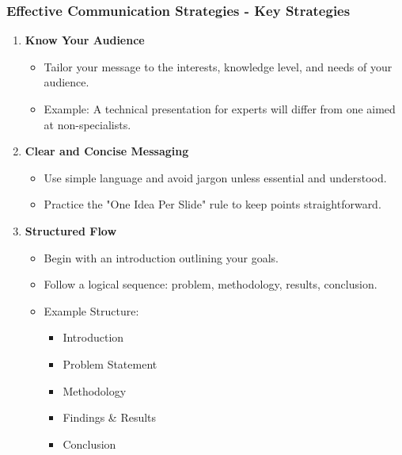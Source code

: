 \documentclass[aspectratio=169]{beamer}
\begin{document}
\begin{frame}[fragile]
    \frametitle{Effective Communication Strategies - Key Strategies}
    \begin{enumerate}
        \item \textbf{Know Your Audience}
        \begin{itemize}
            \item Tailor your message to the interests, knowledge level, and needs of your audience.
            \item Example: A technical presentation for experts will differ from one aimed at non-specialists.
        \end{itemize}

        \item \textbf{Clear and Concise Messaging}
        \begin{itemize}
            \item Use simple language and avoid jargon unless essential and understood.
            \item Practice the "One Idea Per Slide" rule to keep points straightforward.
        \end{itemize}

        \item \textbf{Structured Flow}
        \begin{itemize}
            \item Begin with an introduction outlining your goals.
            \item Follow a logical sequence: problem, methodology, results, conclusion.
            \item Example Structure:
            \begin{itemize}
                \item Introduction
                \item Problem Statement
                \item Methodology
                \item Findings \& Results
                \item Conclusion
            \end{itemize}
        \end{itemize}
    \end{enumerate}
\end{frame}
\end{document}

